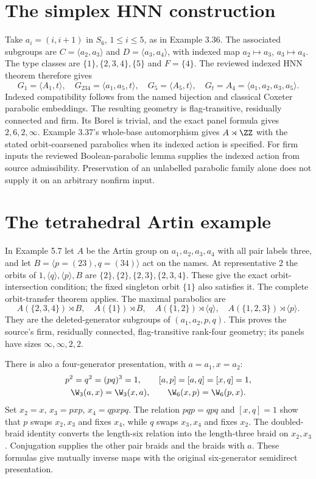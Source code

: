 \section{The simplex HNN construction}
Take $a_i=(i,i+1)$ in $S_6$, $1\leq i\leq5$, as in
Example 3.36. The associated subgroups are
$C=\langle a_2,a_3\rangle$ and $D=\langle a_3,a_4\rangle$,
with indexed map $a_2\mapsto a_3$, $a_3\mapsto a_4$.
The type classes are $\{1\},\{2,3,4\},\{5\}$ and $F=\{4\}$.
The reviewed indexed HNN theorem therefore gives
\[
 G_1=\langle A_1,t\rangle,\quad G_{234}=\langle a_1,a_5,t\rangle,
 \quad G_5=\langle A_5,t\rangle,\quad
 G_t=A_4=\langle a_1,a_2,a_3,a_5\rangle.
\]
Indexed compatibility follows from the named bijection and classical
Coxeter parabolic embeddings. The resulting geometry is
flag-transitive, residually connected and firm. Its Borel is trivial,
and the exact panel formula gives $2,6,2,\infty$.
Example 3.37's whole-base automorphism gives $A\rtimes\ZZ$ with
the stated orbit-coarsened parabolics when its indexed action is
specified. For firm inputs the reviewed Boolean-parabolic lemma
supplies the indexed action from source admissibility. Preservation
of an unlabelled parabolic family alone does not supply it on an
arbitrary nonfirm input.

\section{The tetrahedral Artin example}
In Example 5.7 let $A$ be the Artin group on $a_1,a_2,a_3,a_4$
with all pair labels three, and let $B=\langle p=(23),q=(34)\rangle$
act on the names. At representative 2 the orbits of
$1,\langle q\rangle,\langle p\rangle,B$ are
$\{2\},\{2\},\{2,3\},\{2,3,4\}$. These give the exact
orbit-intersection condition; the fixed singleton orbit $\{1\}$
also satisfies it. The complete orbit-transfer theorem applies.
The maximal parabolics are
\[
 A(\{2,3,4\})\rtimes B,\quad A(\{1\})\rtimes B,\quad
 A(\{1,2\})\rtimes\langle q\rangle,\quad
 A(\{1,2,3\})\rtimes\langle p\rangle.
\]
They are the deleted-generator subgroups of $(a_1,a_2,p,q)$.
This proves the source's firm, residually connected, flag-transitive
rank-four geometry; its panels have sizes $\infty,\infty,2,2$.

There is also a four-generator presentation, with $a=a_1,x=a_2$:
\[
 \begin{gathered}
 p^2=q^2=(pq)^3=1,\qquad [a,p]=[a,q]=[x,q]=1,\\
 \W_3(a,x)=\W_3(x,a),\qquad\W_6(x,p)=\W_6(p,x).
 \end{gathered}
\]
Set $x_2=x$, $x_3=pxp$, $x_4=qpxpq$. The relation $pqp=qpq$
and $[x,q]=1$ show that $p$ swaps $x_2,x_3$ and fixes $x_4$,
while $q$ swaps $x_3,x_4$ and fixes $x_2$.
The doubled-braid identity converts the length-six relation into
the length-three braid on $x_2,x_3$. Conjugation supplies the other
pair braids and the braids with $a$. These formulas give mutually
inverse maps with the original six-generator semidirect presentation.

